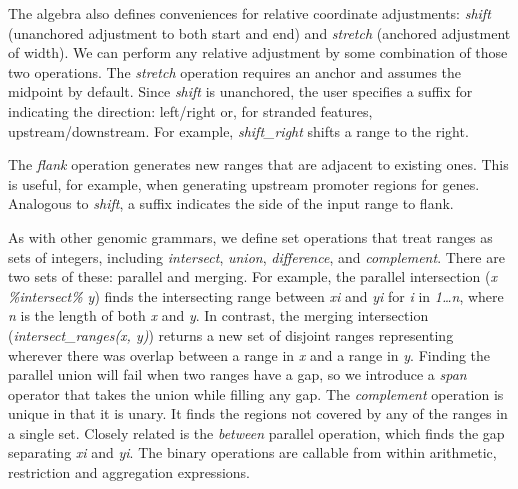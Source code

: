 \documentclass[]{article}
\begin{document}
The algebra also defines conveniences for relative coordinate
adjustments: \emph{shift} (unanchored adjustment to both start and end)
and \emph{stretch} (anchored adjustment of width). We can perform any
relative adjustment by some combination of those two operations. The
\emph{stretch} operation requires an anchor and assumes the midpoint by
default. Since \emph{shift} is unanchored, the user specifies a suffix
for indicating the direction: left/right or, for stranded features,
upstream/downstream. For example, \emph{shift\_right} shifts a range to
the right.

The \emph{flank} operation generates new ranges that are adjacent to
existing ones. This is useful, for example, when generating upstream
promoter regions for genes. Analogous to \emph{shift}, a suffix
indicates the side of the input range to flank.

As with other genomic grammars, we define set operations that treat
ranges as sets of integers, including \emph{intersect}, \emph{union},
\emph{difference}, and \emph{complement}. There are two sets of these:
parallel and merging. For example, the parallel intersection (\emph{x
\%intersect\% y}) finds the intersecting range between \emph{xi} and
\emph{yi} for \emph{i} in \emph{1\ldots{}n}, where \emph{n} is the
length of both \emph{x} and \emph{y}. In contrast, the merging
intersection (\emph{intersect\_ranges(x, y)}) returns a new set of
disjoint ranges representing wherever there was overlap between a range
in \emph{x} and a range in \emph{y}. Finding the parallel union will
fail when two ranges have a gap, so we introduce a \emph{span} operator
that takes the union while filling any gap. The \emph{complement}
operation is unique in that it is unary. It finds the regions not
covered by any of the ranges in a single set. Closely related is the
\emph{between} parallel operation, which finds the gap separating
\emph{xi} and \emph{yi}. The binary operations are callable from within
arithmetic, restriction and aggregation expressions.
\end{document}
